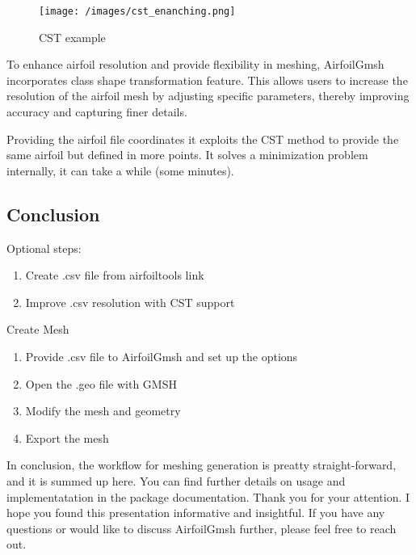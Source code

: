 \documentclass[
  letterpaper,
  DIV=11,
  numbers=noendperiod,
  oneside]{scrartcl}
\begin{document}
\begin{figure}

{\centering \texttt{[image: /images/cst\_enanching.png]}

}

\caption{CST example}

\end{figure}

To enhance airfoil resolution and provide flexibility in meshing,
AirfoilGmsh incorporates class shape transformation feature. This allows
users to increase the resolution of the airfoil mesh by adjusting
specific parameters, thereby improving accuracy and capturing finer
details.

Providing the airfoil file coordinates it exploits the CST method to
provide the same airfoil but defined in more points. It solves a
minimization problem internally, it can take a while (some minutes).

\hypertarget{conclusion}{%
\subsection{Conclusion}\label{conclusion}}

Optional steps:

\begin{enumerate}
\def\labelenumi{\alph{enumi}.}
\item
  Create .csv file from airfoiltools link
\item
  Improve .csv resolution with CST support
\end{enumerate}

Create Mesh

\begin{enumerate}
\def\labelenumi{\arabic{enumi}.}
\item
  Provide .csv file to AirfoilGmsh and set up the options
\item
  Open the .geo file with GMSH
\item
  Modify the mesh and geometry
\item
  Export the mesh
\end{enumerate}

In conclusion, the workflow for meshing generation is preatty
straight-forward, and it is summed up here. You can find further details
on usage and implementatation in the package documentation. Thank you
for your attention. I hope you found this presentation informative and
insightful. If you have any questions or would like to discuss
AirfoilGmsh further, please feel free to reach out.
\end{document}
